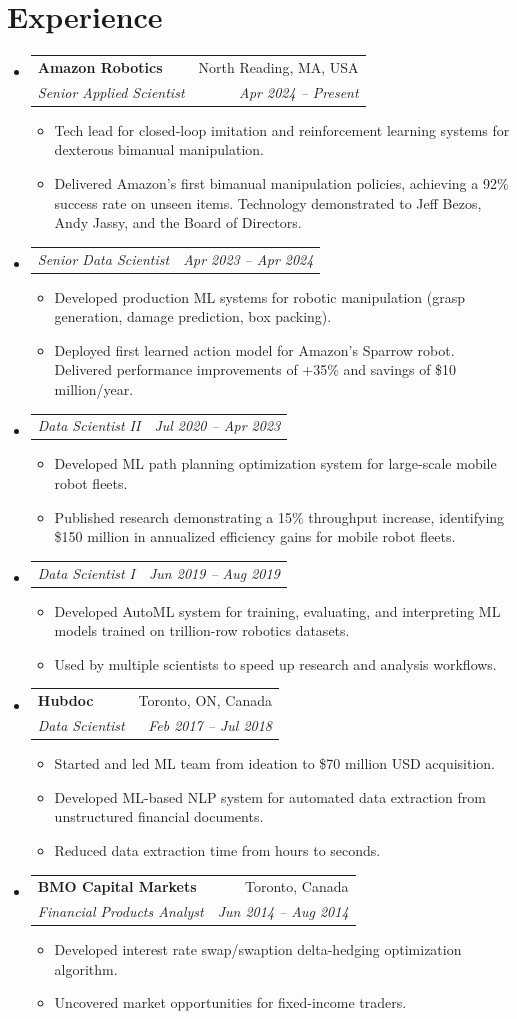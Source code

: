 \documentclass[a4paper,11pt]{article}
\makeatletter
\newcommand{\resumeItem}[1]{
  \item\small{#1}
}
\newcommand{\resumeItemListStart}{
  \begin{itemize}[rightmargin=0.11in, itemsep=2pt, topsep=4pt, parsep=0pt, partopsep=0pt]
}
\newcommand{\resumeItemListEnd}{\end{itemize}}
\newcommand{\resumeQuadHeading}[4]{
  \item
  \begin{tabular*}{0.96\textwidth}[t]{l@{\extracolsep{\fill}}r}
    \textbf{#1} & #2 \\
    \textit{\small#3} & \textit{\small #4} \\
  \end{tabular*}
}
\newcommand{\resumeQuadHeadingChild}[2]{
  \item
  \begin{tabular*}{0.96\textwidth}[t]{l@{\extracolsep{\fill}}r}
    \textit{\small#1} & \textit{\small#2} \\
  \end{tabular*}
}
\newcommand{\resumeHeadingListStart}{
  \begin{itemize}[leftmargin=0.15in, label={}]
}
\newcommand{\resumeHeadingListEnd}{\end{itemize}}
\makeatother
\begin{document}
\section{Experience}
\resumeHeadingListStart{}
  \resumeQuadHeading{Amazon Robotics}{North Reading, MA, USA}{Senior Applied Scientist}{Apr 2024 -- Present}
    \resumeItemListStart
      \resumeItem{Tech lead for closed-loop imitation and reinforcement learning systems for dexterous bimanual manipulation.}
      \resumeItem{Delivered Amazon’s first bimanual manipulation policies, achieving a 92\% success rate on unseen items. Technology demonstrated to Jeff Bezos, Andy Jassy, and the Board of Directors.}
    \resumeItemListEnd
  \resumeQuadHeadingChild{Senior Data Scientist}{Apr 2023 -- Apr 2024}
    \resumeItemListStart
      \resumeItem{Developed production ML systems for robotic manipulation (grasp generation, damage prediction, box packing).}
      \resumeItem{Deployed first learned action model for Amazon's Sparrow robot. Delivered performance improvements of +35\% and savings of \$10 million/year.}
    \resumeItemListEnd
  \resumeQuadHeadingChild{Data Scientist II}{Jul 2020 -- Apr 2023}
    \resumeItemListStart
      \resumeItem{Developed ML path planning optimization system for large-scale mobile robot fleets.}
      \resumeItem{Published research demonstrating a 15\% throughput increase, identifying \$150 million in annualized efficiency gains for mobile robot fleets.}
    \resumeItemListEnd
  \resumeQuadHeadingChild{Data Scientist I}{Jun 2019 -- Aug 2019}
    \resumeItemListStart
      \resumeItem{Developed AutoML system for training, evaluating, and interpreting ML models trained on trillion-row robotics datasets.}
      \resumeItem{Used by multiple scientists to speed up research and analysis workflows.}
    \resumeItemListEnd
  \resumeQuadHeading{Hubdoc}{Toronto, ON, Canada}
  {Data Scientist}{Feb 2017 -- Jul 2018}
    \resumeItemListStart{}
        \resumeItem{Started and led ML team from ideation to \$70 million USD acquisition.}
        \resumeItem{Developed ML-based NLP system for automated data extraction from unstructured financial documents.}
        \resumeItem{Reduced data extraction time from hours to seconds.}
    \resumeItemListEnd{}
  \resumeQuadHeading{BMO Capital Markets}{Toronto, Canada}
  {Financial Products Analyst}{Jun 2014 -- Aug 2014}
    \resumeItemListStart{}
        \resumeItem{Developed interest rate swap/swaption delta-hedging optimization algorithm.}
        \resumeItem{Uncovered market opportunities for fixed-income traders.}
    \resumeItemListEnd{}
\resumeHeadingListEnd{}
\end{document}
